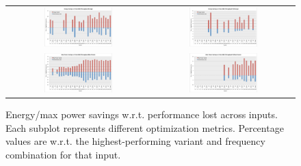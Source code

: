 \setlength\tabcolsep{0 pt}
\begin{figure}[tb]
\centering
\begin{tabular}{c  c}
\includegraphics[width=0.5\textwidth]{figs/energy_k80.pdf} &
\includegraphics[width=0.5\textwidth]{figs/energy_tp_k80.pdf} \\
%
\includegraphics[width=0.5\textwidth]{figs/max_power_k80.pdf} &
\includegraphics[width=0.5\textwidth]{figs/max_power_tp_k80.pdf} \\

\end{tabular}
\caption{Energy/max power savings w.r.t. performance lost across inputs. Each subplot represents different optimization metrics. Percentage values are w.r.t. the highest-performing variant and frequency combination
for that input.}
\label{fig:objective_func}
\end{figure}

